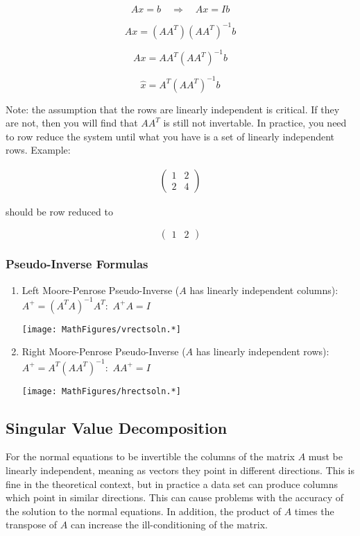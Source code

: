 \[Ax = b \quad\Rightarrow\quad   Ax = I b\]

\[A x = \left(A A^T\right) \left(A A^T\right)^{-1} b\]

\[Ax = AA^T \left(A A^T\right)^{-1} b\]

\[\hat{x} = A^T \left(A A^T\right)^{-1} b\]

Note: the assumption that the rows are linearly independent is critical.
If they are not, then you will find that \(A A^T\) is still not
invertable. In practice, you need to row reduce the system until what
you have is a set of linearly independent rows. Example:

\[\begin{aligned}
\begin{pmatrix} 1 & 2 \\ 2 & 4 \end{pmatrix}
\end{aligned}\]

should be row reduced to

\[\begin{pmatrix} 1 & 2  \end{pmatrix}\]

\hypertarget{pseudo-inverse-formulas}{%
\subsubsection{Pseudo-Inverse Formulas}\label{pseudo-inverse-formulas}}

\begin{enumerate}
\item
  Left Moore-Penrose Pseudo-Inverse (\(A\) has linearly independent
  columns): \(A^+ = \left(A^TA\right)^{-1} A^T :\) \(A^+ A =I\)

  \texttt{[image: MathFigures/vrectsoln.*]}
\item
  Right Moore-Penrose Pseudo-Inverse (\(A\) has linearly independent
  rows): \(A^+ = A^T \left(AA^T\right)^{-1}:\) \(A A^+ =I\)

  \texttt{[image: MathFigures/hrectsoln.*]}
\end{enumerate}

\hypertarget{singular-value-decomposition}{%
\subsection{Singular Value
Decomposition}\label{singular-value-decomposition}}

For the normal equations to be invertible the columns of the matrix
\(A\) must be linearly independent, meaning as vectors they point in
different directions. This is fine in the theoretical context, but in
practice a data set can produce columns which point in similar
directions. This can cause problems with the accuracy of the solution to
the normal equations. In addition, the product of \(A\) times the
transpose of \(A\) can increase the ill-conditioning of the matrix.

